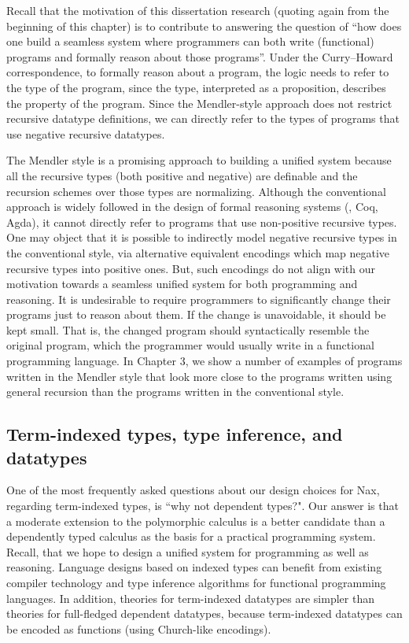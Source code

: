 Recall that the motivation of this dissertation research
(quoting again from the beginning of this chapter)
is to contribute to answering the question of
``how does one build a seamless system where programmers can both
write (functional) programs and formally reason about those programs''.
Under the Curry--Howard correspondence,
to formally reason about a program, the logic needs to refer to the type of
the program, since the type, interpreted as a proposition, describes
the property of the program. Since the Mendler-style approach does not
restrict recursive datatype definitions, we can directly refer to the types
of programs that use negative recursive datatypes.

The Mendler style is a promising approach to building a unified system because
all the recursive types (both positive and negative) are definable and
the recursion schemes over those types are normalizing.
Although the conventional approach is widely followed
in the design of formal reasoning systems (\eg, Coq, Agda), it cannot directly
refer to programs that use non-positive recursive types. One may object that
it is possible to indirectly model negative recursive types
in the conventional style, via alternative equivalent encodings
which map negative recursive types into positive ones. But, such
encodings do not align with our motivation towards a seamless unified
system for both programming and reasoning. It is undesirable to require
programmers to significantly change their programs just to reason about them.
If the change is unavoidable, it should be kept small. That is,
the changed program should syntactically resemble the original program,
which the programmer would usually write in a functional programming language.
In Chapter 3, we show a number of examples of programs written in
the Mendler style that look more close to the programs written using
general recursion than the programs written in the conventional style.

\subsection{Term-indexed types, type inference, and datatypes}
\label{sec:intro:concepts:indexed}
One of the most frequently asked questions about our design choices for Nax,
regarding term-indexed types, is ``why not dependent types?". Our answer
is that a moderate extension to the polymorphic calculus is a better candidate
than a dependently typed calculus as the basis for a practical programming
system. Recall, that we hope to design a unified system for programming
as well as reasoning. Language designs based on indexed types can
benefit from existing compiler technology and type inference algorithms
for functional programming languages. In addition, theories for
term-indexed datatypes are simpler than theories for full-fledged
dependent datatypes, because term-indexed datatypes can be encoded as
functions (using Church-like encodings).

